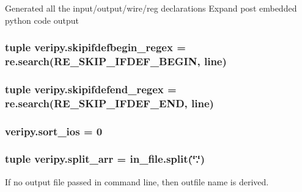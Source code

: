 Generated all the input/output/wire/reg declarations Expand post embedded python code output \hypertarget{namespaceveripy_a32070d26198948bdf028e393cb565ade}{
\subsubsection[{skipifdefbegin\-\_\-regex}]{\setlength{\rightskip}{0pt plus 5cm}tuple veripy.\-skipifdefbegin\-\_\-regex = re.\-search(R\-E\-\_\-\-S\-K\-I\-P\-\_\-\-I\-F\-D\-E\-F\-\_\-\-B\-E\-G\-I\-N, {\bf line})}}\label{namespaceveripy_a32070d26198948bdf028e393cb565ade}
\hypertarget{namespaceveripy_a3e2775895f7dc417880c6298fcfbb5db}{
\subsubsection[{skipifdefend\-\_\-regex}]{\setlength{\rightskip}{0pt plus 5cm}tuple veripy.\-skipifdefend\-\_\-regex = re.\-search(R\-E\-\_\-\-S\-K\-I\-P\-\_\-\-I\-F\-D\-E\-F\-\_\-\-E\-N\-D, {\bf line})}}\label{namespaceveripy_a3e2775895f7dc417880c6298fcfbb5db}
\hypertarget{namespaceveripy_add6f0c3ebf250f985c69973dd91397c2}{
\subsubsection[{sort\-\_\-ios}]{\setlength{\rightskip}{0pt plus 5cm}veripy.\-sort\-\_\-ios = 0}}\label{namespaceveripy_add6f0c3ebf250f985c69973dd91397c2}
\hypertarget{namespaceveripy_aa088bc1dbe01082dd4220120602b06a5}{
\subsubsection[{split\-\_\-arr}]{\setlength{\rightskip}{0pt plus 5cm}tuple veripy.\-split\-\_\-arr = in\-\_\-file.\-split(\char`\"{}.\char`\"{})}}\label{namespaceveripy_aa088bc1dbe01082dd4220120602b06a5}


If no output file passed in command line, then outfile name is derived. 

